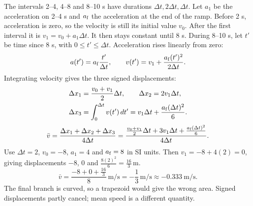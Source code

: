 \begin{problem}[25 pts]
\end{problem}
\begin{solution}
The intervals 2--4, 4--8 and 8--10 s have durations
$\Delta t,2\Delta t,\Delta t$.
Let $a_1$ be the acceleration on 2--4 s and $a_{\rm f}$ the acceleration at the end of the ramp.
Before 2 s, acceleration is zero, so the velocity is still its initial value $v_0$.
After the first interval it is
$v_1=v_0+a_1\Delta t$. It then stays constant until 8 s.
During 8--10 s, let $t'$ be time since 8 s, with $0\leq t'\leq\Delta t$.
Acceleration rises linearly from zero:
\[
a(t')=a_{\rm f}\frac{t'}{\Delta t},\qquad
v(t')=v_1+\frac{a_{\rm f}(t')^2}{2\Delta t}.
\]
Integrating velocity gives the three signed displacements:
\[
\begin{aligned}
\Delta x_1&=\frac{v_0+v_1}{2}\Delta t,\qquad
\Delta x_2=2v_1\Delta t,\\
\Delta x_3&=\int_0^{\Delta t}v(t')\,dt'
=v_1\Delta t+\frac{a_{\rm f}(\Delta t)^2}{6}.
\end{aligned}
\]
\[
\bar v=\frac{\Delta x_1+\Delta x_2+\Delta x_3}{4\Delta t}
=\frac{\frac{v_0+v_1}{2}\Delta t+3v_1\Delta t+
\frac{a_{\rm f}(\Delta t)^2}{6}}{4\Delta t}.
\]
Use $\Delta t=2$, $v_0=-8$, $a_1=4$ and $a_{\rm f}=8$ in SI units.
Then $v_1=-8+4(2)=0$, giving displacements
$-8$, $0$ and $\frac{8(2)^2}{6}=\frac{16}{3}\,\unit{\metre}$.
\[
\bar v=\frac{-8+0+\frac{16}{3}}{8}\,\unit{\metre\per\second}
=-\frac{1}{3}\,\unit{\metre\per\second}
\approx-\qty{0.333}{\metre\per\second}.
\]
The final branch is curved, so a trapezoid would give the wrong area.
Signed displacements partly cancel; mean speed is a different quantity.
\end{solution}

